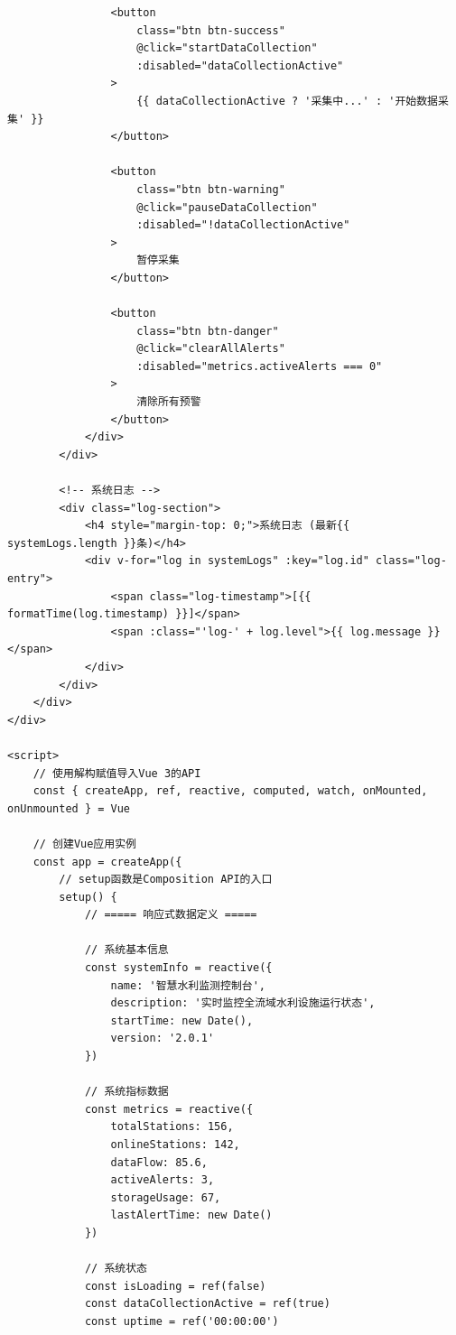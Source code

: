 \begin{verbatim}
                <button 
                    class="btn btn-success" 
                    @click="startDataCollection"
                    :disabled="dataCollectionActive"
                >
                    {{ dataCollectionActive ? '采集中...' : '开始数据采集' }}
                </button>
                
                <button 
                    class="btn btn-warning" 
                    @click="pauseDataCollection"
                    :disabled="!dataCollectionActive"
                >
                    暂停采集
                </button>
                
                <button 
                    class="btn btn-danger" 
                    @click="clearAllAlerts"
                    :disabled="metrics.activeAlerts === 0"
                >
                    清除所有预警
                </button>
            </div>
        </div>
        
        <!-- 系统日志 -->
        <div class="log-section">
            <h4 style="margin-top: 0;">系统日志 (最新{{ systemLogs.length }}条)</h4>
            <div v-for="log in systemLogs" :key="log.id" class="log-entry">
                <span class="log-timestamp">[{{ formatTime(log.timestamp) }}]</span>
                <span :class="'log-' + log.level">{{ log.message }}</span>
            </div>
        </div>
    </div>
</div>

<script>
    // 使用解构赋值导入Vue 3的API
    const { createApp, ref, reactive, computed, watch, onMounted, onUnmounted } = Vue
    
    // 创建Vue应用实例
    const app = createApp({
        // setup函数是Composition API的入口
        setup() {
            // ===== 响应式数据定义 =====
            
            // 系统基本信息
            const systemInfo = reactive({
                name: '智慧水利监测控制台',
                description: '实时监控全流域水利设施运行状态',
                startTime: new Date(),
                version: '2.0.1'
            })
            
            // 系统指标数据
            const metrics = reactive({
                totalStations: 156,
                onlineStations: 142,
                dataFlow: 85.6,
                activeAlerts: 3,
                storageUsage: 67,
                lastAlertTime: new Date()
            })
            
            // 系统状态
            const isLoading = ref(false)
            const dataCollectionActive = ref(true)
            const uptime = ref('00:00:00')
            

\end{verbatim}
